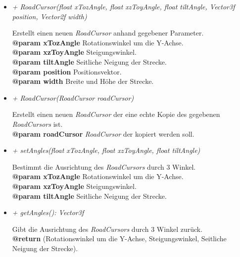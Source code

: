         \begin{itemize}

            \item  \textit{+ RoadCursor(float xTozAngle, float xzToyAngle, float tiltAngle, Vector3f position, Vector2f width)}
                \begin{leftbar}[0.9\linewidth]
                    Erstellt einen neuen \textit{RoadCursor} anhand gegebener Parameter.\\
                    \textbf{@param xTozAngle} Rotationswinkel um die Y-Achse.\\
                    \textbf{@param xzToyAngle} Steigungswinkel.\\
                    \textbf{@param tiltAngle} Seitliche Neigung der Strecke.\\
                    \textbf{@param position} Positionsvektor.\\
                    \textbf{@param width} Breite und Höhe der Strecke.\\
                \end{leftbar}

            \item  \textit{+ RoadCursor(RoadCursor roadCursor)}
                \begin{leftbar}[0.9\linewidth]
                    Erstellt einen neuen \textit{RoadCursor} der eine echte Kopie des gegebenen \textit{RoadCursors} ist.\\
                    \textbf{@param roadCursor} \textit{RoadCursor} der kopiert werden soll.
                \end{leftbar}

            \pagebreak

            \item  \textit{+ setAngles(float xTozAngle, float xzToyAngle, float tiltAngle)}
                \begin{leftbar}[0.9\linewidth]
                    Bestimmt die Ausrichtung des \textit{RoadCursors} durch 3 Winkel.\\
                    \textbf{@param xTozAngle} Rotationswinkel um die Y-Achse.\\
                    \textbf{@param xzToyAngle} Steigungswinkel.\\
                    \textbf{@param tiltAngle} Seitliche Neigung der Strecke.
                \end{leftbar}
                    

            \item  \textit{+ getAngles(): Vector3f}
                \begin{leftbar}[0.9\linewidth]
                    Gibt die Ausrichtung des \textit{RoadCursors} durch 3 Winkel zurück.\\
                    \textbf{@return} (Rotationswinkel um die Y-Achse, Steigungswinkel, Seitliche Neigung der Strecke).
                \end{leftbar}


\end{itemize}
